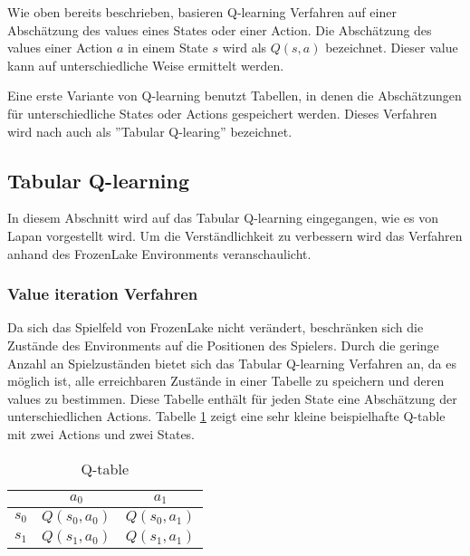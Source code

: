\documentclass[11pt]{scrartcl}
\begin{document}
Wie oben bereits beschrieben, basieren Q-learning Verfahren auf einer Abschätzung des
values eines States oder einer Action. Die Abschätzung des values einer Action $a$ in
einem State $s$ wird als $Q(s, a)$ bezeichnet. Dieser value kann auf unterschiedliche
Weise ermittelt werden.

Eine erste Variante von Q-learning benutzt Tabellen, in denen die Abschätzungen
für unterschiedliche States oder Actions gespeichert werden. Dieses Verfahren wird nach
\cite[~S.193]{L2018} auch als ''Tabular Q-learing'' bezeichnet.


\subsection{Tabular Q-learning}
\label{sec:tab-q-learning}
In diesem Abschnitt wird auf das Tabular Q-learning eingegangen, wie es von Lapan
\cite[~S.193]{L2018} vorgestellt wird. Um die Ver\-ständ\-lich\-keit zu verbessern wird
das Verfahren anhand des FrozenLake Environments veranschaulicht.

\subsubsection{Value iteration Verfahren}
Da sich das Spielfeld von FrozenLake nicht verändert, beschränken sich die Zustände des
Environments auf die Positionen des Spielers. Durch die geringe Anzahl an Spielzuständen
bietet sich das Tabular Q-learning Verfahren an, da es möglich ist, alle erreichbaren
Zustände in einer Tabelle zu speichern und deren values zu bestimmen. Diese Tabelle
enthält für jeden State eine Abschätzung der unterschiedlichen Actions.
Tabelle \ref{tab:q_table} zeigt eine sehr kleine beispielhafte Q-table mit zwei Actions
und zwei States.

\begin{table}[ht]
  \begin{center}
    \begin{tabular}{c | c | c}
       & $a_0$ & $a_1$ \\
      \hline
      $s_0$ & $Q(s_0, a_0)$ &$ Q(s_0, a_1)$ \\
      \hline
      $s_1$ & $Q(s_1, a_0)$ & $Q(s_1, a_1)$ \\
    \end{tabular}

    \caption[Q-table]{Q-table}
    \label{tab:q_table}
  \end{center}
\end{table}
\end{document}
